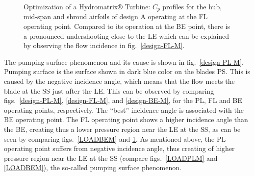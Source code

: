\begin{figure}[h!]
\begin{minipage}[b]{1\linewidth}
 \centering
\end{minipage}
\caption{Optimization of a Hydromatrix$\circledR$ Turbine: $C_p$ profiles for the hub, mid-span and shroud airfoils of design A operating at the FL operating point. Compared to its operation at the BE point, there is a pronounced undershooting close to the LE which can be explained by observing the flow incidence in fig.\ \ref{design-FL-M}.}
\label{LOADFLM}
\end{figure}

The pumping surface phenomenon and its cause is shown in fig.\ \ref{design-PL-M}. Pumping surface is the surface shown in dark blue color on the blades PS. This is caused by the negative incidence angle, which means that the flow meets the blade at the SS just after the LE. This can be observed by comparing figs.\ \ref{design-PL-M}, \ref{design-FL-M}, and \ref{design-BE-M}, for the  PL, FL and BE operating points, respectively. The ``best'' incidence angle is associated with the BE operating point. The FL operating point shows a higher incidence angle than the BE, creating thus a lower pressure region near the LE at the SS, as can be seen by comparing figs.\  \ref{LOADBEM} and \ref{LOADFLM}. As mentioned above, the PL operating point suffers from negative incidence angle, thus creating of higher pressure region near the LE at the SS (compare figs.\ \ref{LOADPLM} and \ref{LOADBEM}), the so-called pumping surface phenomenon.    



